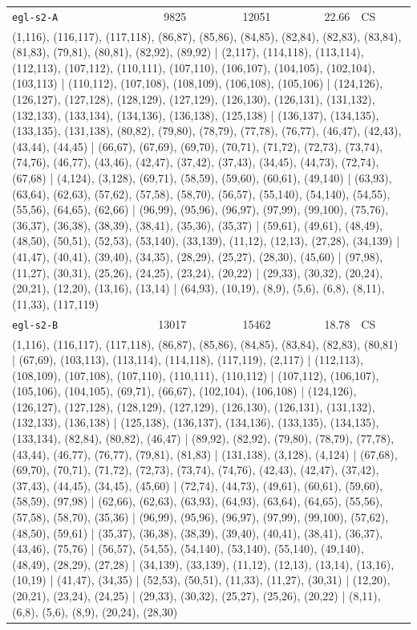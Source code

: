 \begin{longtable}{lrrrl}
\texttt{egl-s2-A} & 9825 & 12051 & 22.66 & CS \\
\multicolumn{5}{p{0.96\linewidth}}{\tiny\raggedright\arraybackslash (1,116), (116,117), (117,118), (86,87), (85,86), (84,85), (82,84), (82,83), (83,84), (81,83), (79,81), (80,81), (82,92), (89,92) | (2,117), (114,118), (113,114), (112,113), (107,112), (110,111), (107,110), (106,107), (104,105), (102,104), (103,113) | (110,112), (107,108), (108,109), (106,108), (105,106) | (124,126), (126,127), (127,128), (128,129), (127,129), (126,130), (126,131), (131,132), (132,133), (133,134), (134,136), (136,138), (125,138) | (136,137), (134,135), (133,135), (131,138), (80,82), (79,80), (78,79), (77,78), (76,77), (46,47), (42,43), (43,44), (44,45) | (66,67), (67,69), (69,70), (70,71), (71,72), (72,73), (73,74), (74,76), (46,77), (43,46), (42,47), (37,42), (37,43), (34,45), (44,73), (72,74), (67,68) | (4,124), (3,128), (69,71), (58,59), (59,60), (60,61), (49,140) | (63,93), (63,64), (62,63), (57,62), (57,58), (58,70), (56,57), (55,140), (54,140), (54,55), (55,56), (64,65), (62,66) | (96,99), (95,96), (96,97), (97,99), (99,100), (75,76), (36,37), (36,38), (38,39), (38,41), (35,36), (35,37) | (59,61), (49,61), (48,49), (48,50), (50,51), (52,53), (53,140), (33,139), (11,12), (12,13), (27,28), (34,139) | (41,47), (40,41), (39,40), (34,35), (28,29), (25,27), (28,30), (45,60) | (97,98), (11,27), (30,31), (25,26), (24,25), (23,24), (20,22) | (29,33), (30,32), (20,24), (20,21), (12,20), (13,16), (13,14) | (64,93), (10,19), (8,9), (5,6), (6,8), (8,11), (11,33), (117,119)} \\[2pt]
\texttt{egl-s2-B} & 13017 & 15462 & 18.78 & CS \\
\multicolumn{5}{p{0.96\linewidth}}{\tiny\raggedright\arraybackslash (1,116), (116,117), (117,118), (86,87), (85,86), (84,85), (83,84), (82,83), (80,81) | (67,69), (103,113), (113,114), (114,118), (117,119), (2,117) | (112,113), (108,109), (107,108), (107,110), (110,111), (110,112) | (107,112), (106,107), (105,106), (104,105), (69,71), (66,67), (102,104), (106,108) | (124,126), (126,127), (127,128), (128,129), (127,129), (126,130), (126,131), (131,132), (132,133), (136,138) | (125,138), (136,137), (134,136), (133,135), (134,135), (133,134), (82,84), (80,82), (46,47) | (89,92), (82,92), (79,80), (78,79), (77,78), (43,44), (46,77), (76,77), (79,81), (81,83) | (131,138), (3,128), (4,124) | (67,68), (69,70), (70,71), (71,72), (72,73), (73,74), (74,76), (42,43), (42,47), (37,42), (37,43), (44,45), (34,45), (45,60) | (72,74), (44,73), (49,61), (60,61), (59,60), (58,59), (97,98) | (62,66), (62,63), (63,93), (64,93), (63,64), (64,65), (55,56), (57,58), (58,70), (35,36) | (96,99), (95,96), (96,97), (97,99), (99,100), (57,62), (48,50), (59,61) | (35,37), (36,38), (38,39), (39,40), (40,41), (38,41), (36,37), (43,46), (75,76) | (56,57), (54,55), (54,140), (53,140), (55,140), (49,140), (48,49), (28,29), (27,28) | (34,139), (33,139), (11,12), (12,13), (13,14), (13,16), (10,19) | (41,47), (34,35) | (52,53), (50,51), (11,33), (11,27), (30,31) | (12,20), (20,21), (23,24), (24,25) | (29,33), (30,32), (25,27), (25,26), (20,22) | (8,11), (6,8), (5,6), (8,9), (20,24), (28,30)} \\[2pt]

\end{longtable}
